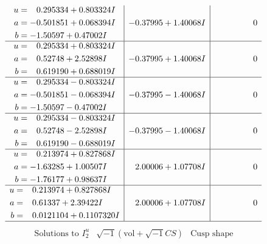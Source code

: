\documentclass[1p]{elsarticle_modified}
\theoremstyle{definition}
\newcommand{\I}{\sqrt{-1}}
\begin{document}
$$\begin{array}{c|c|c}
\begin{aligned}
u &= \phantom{-}0.295334 + 0.803324 I \\
a &= -0.501851 + 0.068394 I \\
b &= -1.50597 + 0.47002 I\end{aligned}
 & -0.37995 + 1.40068 I & \phantom{-0.000000 } 0 \\ \hline\begin{aligned}
u &= \phantom{-}0.295334 + 0.803324 I \\
a &= \phantom{-}0.52748 + 2.52898 I \\
b &= \phantom{-}0.619190 + 0.688019 I\end{aligned}
 & -0.37995 + 1.40068 I & \phantom{-0.000000 } 0 \\ \hline\begin{aligned}
u &= \phantom{-}0.295334 - 0.803324 I \\
a &= -0.501851 - 0.068394 I \\
b &= -1.50597 - 0.47002 I\end{aligned}
 & -0.37995 - 1.40068 I & \phantom{-0.000000 } 0 \\ \hline\begin{aligned}
u &= \phantom{-}0.295334 - 0.803324 I \\
a &= \phantom{-}0.52748 - 2.52898 I \\
b &= \phantom{-}0.619190 - 0.688019 I\end{aligned}
 & -0.37995 - 1.40068 I & \phantom{-0.000000 } 0 \\ \hline\begin{aligned}
u &= \phantom{-}0.213974 + 0.827868 I \\
a &= -1.63285 + 1.00507 I \\
b &= -1.76177 + 0.98637 I\end{aligned}
 & \phantom{-}2.00006 + 1.07708 I & \phantom{-0.000000 } 0 \\ \hline\begin{aligned}
u &= \phantom{-}0.213974 + 0.827868 I \\
a &= \phantom{-}0.61337 + 2.39422 I \\
b &= \phantom{-}0.0121104 + 0.1107320 I\end{aligned}
 & \phantom{-}2.00006 + 1.07708 I & \phantom{-0.000000 } 0\\
 \hline 
 \end{array}$$\newpage$$\begin{array}{c|c|c}  
\text{Solutions to }I^u_{2}& \I (\text{vol} + \sqrt{-1}CS) & \text{Cusp shape}\\
 \hline 
\begin{aligned}

\end{aligned}
\end{array}$$
\end{document}
